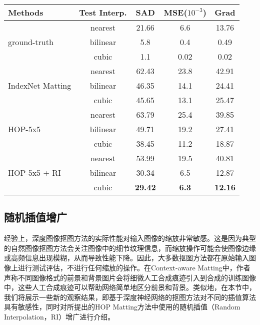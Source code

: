 \begin{table}[t]
	\setlength{\tabcolsep}{15pt}
	\centering
	\begin{tabular}{l|cccc}  
		\toprule
		Methods & Test Interp.& SAD & MSE($10^{-3}$)  & Grad\\
		\midrule
		\multirow{3}{*}{ground-truth}&nearest& 21.66& 6.6& 13.76 \\
		& bilinear&5.8& 0.4&0.49 \\
		& cubic & 1.1& 0.02& 0.02\\
		\midrule
		\multirow{3}{*}{IndexNet Matting \cite{lu2019indices}}&nearest& 62.43& 23.8& 42.91 \\
		& bilinear&46.35& 14.1&24.41 \\
		& cubic & 45.65& 13.1& 25.47\\
		\midrule
		\multirow{3}{*}{HOP-5x5}&nearest&63.79&25.4&39.85\\
		& bilinear & 49.71 & 19.2 & 27.41\\
		& cubic & 38.45& 11.2  &18.87\\
		\midrule
		\multirow{3}{*}{HOP-5x5 + RI}  &nearest& 53.99 &19.5  &40.81\\
		& bilinear &30.34&6.5 &12.87\\
		& cubic & \textbf{29.42} & \textbf{6.3}&\textbf{12.16}\\
		\bottomrule
	\end{tabular}
	\label{tab5:RI}
\end{table}

\subsection{随机插值增广}
\label{sec5:RI}
经验上，深度图像抠图方法的实际性能对输入图像的缩放非常敏感。这是因为典型的自然图像抠图方法会关注图像中的细节纹理信息，而缩放操作可能会使图像边缘或高频信息出现模糊，从而导致性能下降。因此，大多数抠图方法都在原始输入图像上进行测试评估，不进行任何缩放的操作。在Context-aware Matting\cite{hou2019context}中，作者声称不同图像格式的前景和背景图片会将细微人工合成痕迹引入到合成的训练图像中，这些人工合成痕迹可以帮助网络简单地区分前景和背景。类似地，在本节中，我们将展示一些新的观察结果，即基于深度神经网络的抠图方法对不同的插值算法具有敏感性，同时对所提出的HOP Matting方法中使用的随机插值（Random Interpolation，RI）增广进行介绍。

